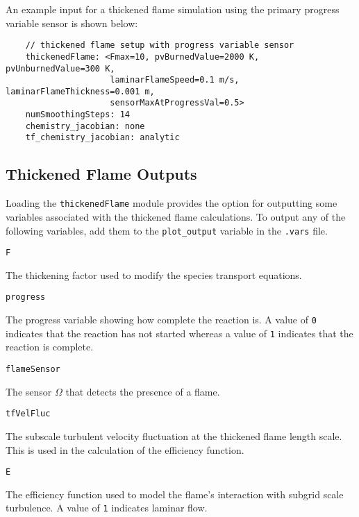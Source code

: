 \documentclass{article}
\begin{document}
An example input for a thickened flame simulation using the primary progress variable sensor is shown below:

\begin{verbatim}
    // thickened flame setup with progress variable sensor
    thickenedFlame: <Fmax=10, pvBurnedValue=2000 K, pvUnburnedValue=300 K,
                     laminarFlameSpeed=0.1 m/s, laminarFlameThickness=0.001 m,
                     sensorMaxAtProgressVal=0.5>
    numSmoothingSteps: 14
    chemistry_jacobian: none
    tf_chemistry_jacobian: analytic
\end{verbatim}

\subsection{Thickened Flame Outputs}

Loading the {\tt thickenedFlame} module provides the option for outputting some variables associated with the thickened flame calculations. To output any of the following variables, add them to the \verb!plot_output! variable in the {\tt .vars} file.

  \begin{list}{}{}
  	
  	
  	\item {\tt F}
  	
  	The thickening factor used to modify the species transport equations.
  	
  	\item {\tt progress}
  	
  	The progress variable showing how complete the reaction is. A value of {\tt 0} indicates that the reaction has not started whereas a value of {\tt 1} indicates that the reaction is complete.
  	
  	\item {\tt flameSensor}
  	  	
  	The sensor {\tt $\Omega$} that detects the presence of a flame.
  	
  	\item {\tt tfVelFluc}
  	
  	The subscale turbulent velocity fluctuation at the thickened flame length scale. This is used in the calculation of the efficiency function.
  	
  	\item {\tt E}
  	
  	The efficiency function used to model the flame's interaction with subgrid scale turbulence. A value of {\tt 1} indicates laminar flow.
  	
  \end{list}


\clearpage





\end{document}
